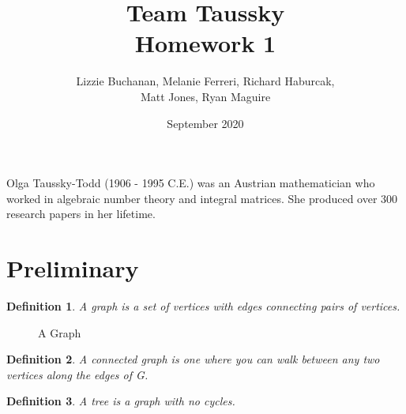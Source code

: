 \documentclass{article}
\title{Team Taussky\\ Homework 1}
\author{Lizzie Buchanan, Melanie Ferreri, Richard Haburcak,\\
        Matt Jones, Ryan Maguire}
\date{September 2020}
\theoremstyle{normal}
\newtheorem{definition}{Definition}
\theoremstyle{thmit}
\begin{document}
\maketitle
Olga Taussky-Todd (1906 - 1995 C.E.) was an Austrian mathematician who worked in
algebraic number theory and integral matrices. She produced over 300 research
papers in her lifetime.
\section{Preliminary}
    \begin{definition}
        A graph is a set of vertices with edges connecting pairs of vertices.
    \end{definition}
    \begin{figure}[H]
        \centering
        \caption{A Graph}
        \label{fig:Graph_Example}
    \end{figure}
    \begin{definition}
        A connected graph is one where you can walk between any two
        vertices along the edges of G.
    \end{definition}
    \begin{definition}
        A tree is a graph with no cycles.
    \end{definition}
    \par
\end{document}
